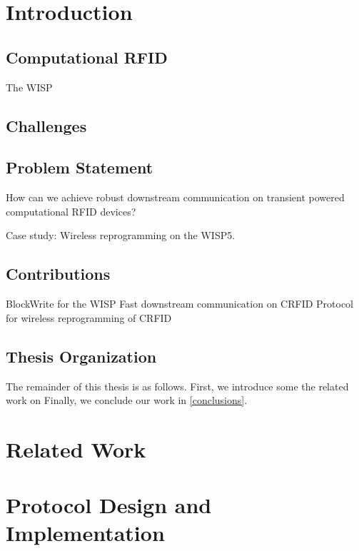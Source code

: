 \documentclass[11pt,twoside,a4paper,openright]{report}
\begin{document}
\tableofcontents

\cleardoublepage

\setcounter{page}{1}

\chapter{Introduction}
\label{intro}

\section{Computational RFID}
The WISP \cite{4539485}

\section{Challenges}

\section{Problem Statement}
How can we achieve robust downstream communication on transient powered computational RFID devices?

Case study: Wireless reprogramming on the WISP5.

\section{Contributions}
BlockWrite for the WISP
Fast downstream communication on CRFID
Protocol for wireless reprogramming of CRFID

\section{Thesis Organization}
The remainder of this thesis is as follows.
First, we introduce some the related work on 
Finally, we conclude our work in \cref{conclusions}.

\chapter{Related Work}
\label{relatedwork}


\chapter{Protocol Design and Implementation}
\label{design}
\end{document}
